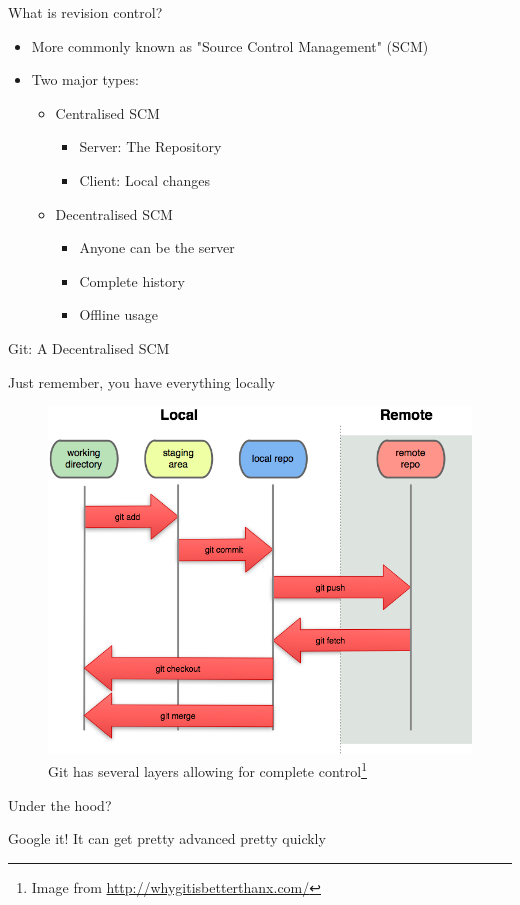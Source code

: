 \begin{frame}{What is revision control?}
    \begin{itemize}
        \item More commonly known as "Source Control Management" (SCM)
        \pause
        \item Two major types:
        \begin{itemize}
            \item Centralised SCM
            \begin{itemize}
                \item Server: The Repository
                \item Client: Local changes
            \end{itemize}
            \pause
            \item Decentralised SCM
            \begin{itemize}
                \item Anyone can be the server %
                \item Complete history
                \item Offline usage
            \end{itemize}
        \end{itemize}  
    \end{itemize}  
\end{frame}

\begin{frame}{Git: A Decentralised SCM}
    \begin{block}{Just remember, you have everything locally}
    \begin{figure}[ht]
        \centering
        \includegraphics[width=0.6\linewidth]{img/overview.png}
        \caption{Git has several layers allowing for complete control\footnote{Image from \href{http://whygitisbetterthanx.com/}{http://whygitisbetterthanx.com/}}}
        \label{fig:figure0}
    \end{figure}
    \end{block}
\end{frame}

\begin{frame}{Under the hood?}
    \begin{block}{Google it!}
        It can get pretty advanced pretty quickly
    \end{block}
\end{frame}
